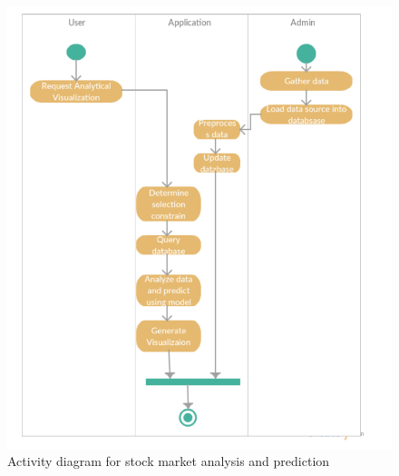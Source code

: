\begin{figure}[h!]
  \includegraphics[width=6in]{fig/activity}
  \caption{Activity diagram for stock market analysis and prediction }\label{fig:activity}
\end{figure}

